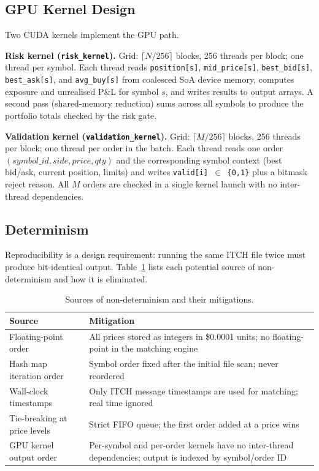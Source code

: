 \documentclass[12pt]{article}
\begin{document}
\subsection{GPU Kernel Design}

Two CUDA kernels implement the GPU path.

\textbf{Risk kernel (\texttt{risk\_kernel}).}
Grid: $\lceil N/256 \rceil$ blocks, 256 threads per block; one thread
per symbol.
Each thread reads \texttt{position[s]}, \texttt{mid\_price[s]},
\texttt{best\_bid[s]}, \texttt{best\_ask[s]}, and \texttt{avg\_buy[s]}
from coalesced SoA device memory, computes exposure and unrealised P\&L
for symbol $s$, and writes results to output arrays.
A second pass (shared-memory reduction) sums across all symbols to
produce the portfolio totals checked by the risk gate.

\textbf{Validation kernel (\texttt{validation\_kernel}).}
Grid: $\lceil M/256 \rceil$ blocks, 256 threads per block; one thread
per order in the batch.
Each thread reads one order $(symbol\_id, side, price, qty)$ and the
corresponding symbol context (best bid/ask, current position, limits)
and writes \texttt{valid[i] $\in$ \{0,1\}} plus a bitmask reject reason.
All $M$ orders are checked in a single kernel launch with no
inter-thread dependencies.

\subsection{Determinism}

Reproducibility is a design requirement: running the same ITCH file
twice must produce bit-identical output.
Table~\ref{tab:determinism} lists each potential source of
non-determinism and how it is eliminated.

\begin{table}[H]
\centering
\small
\caption{Sources of non-determinism and their mitigations.}
\label{tab:determinism}
\begin{tabularx}{\textwidth}{@{}p{3.5cm}X@{}}
\toprule
\textbf{Source} & \textbf{Mitigation} \\
\midrule
Floating-point order &
  All prices stored as integers in \$0.0001 units; no floating-point
  in the matching engine \\[2pt]
Hash map iteration order &
  Symbol order fixed after the initial file scan; never reordered \\[2pt]
Wall-clock timestamps &
  Only ITCH message timestamps are used for matching; real time ignored \\[2pt]
Tie-breaking at price levels &
  Strict FIFO queue; the first order added at a price wins \\[2pt]
GPU kernel output order &
  Per-symbol and per-order kernels have no inter-thread dependencies;
  output is indexed by symbol/order ID \\
\bottomrule
\end{tabularx}
\end{table}
\end{document}
